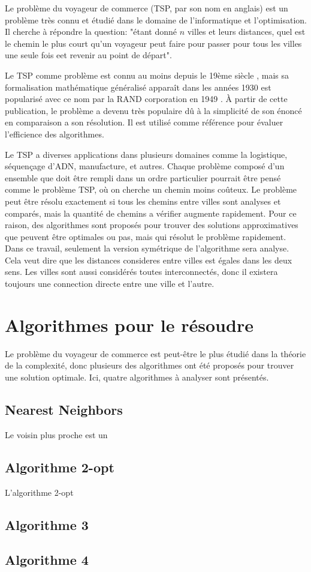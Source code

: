 Le problème du voyageur de commerce (TSP, par son nom en anglais) \cite{book:TSP,chap:TSP} est un problème très connu et étudié dans le domaine de l'informatique et l'optimisation. Il cherche à répondre la question: "étant donné $n$ villes et leurs distances, quel est le chemin le plus court qu'un voyageur peut faire pour passer pour tous les villes une seule fois eet revenir au point de départ".

Le TSP comme problème est connu au moins depuis le 19ème siècle \cite{book:TSP}, mais sa formalisation mathématique généralisé apparaît dans les années 1930 \cite{book:TSP} est popularisé avec ce nom par la RAND corporation en 1949 \cite{book:TSP}. À partir de cette publication, le problème a devenu très populaire dû à la simplicité de son énoncé en comparaison a son résolution. Il est utilisé comme référence pour évaluer l'efficience des algorithmes. %

Le TSP a diverses applications dans plusieurs domaines comme la logistique, séquençage d'ADN, manufacture, et autres. Chaque problème composé d'un ensemble que doit être rempli dans un ordre particulier pourrait être pensé comme le problème TSP, où on cherche un chemin moins coûteux. Le problème peut être résolu exactement si tous les chemins entre villes sont analyses et comparés, mais la quantité de chemins a vérifier augmente rapidement. Pour ce raison, des algorithmes sont proposés pour trouver des solutions approximatives que peuvent être optimales ou pas, mais qui résolut le problème rapidement. Dans ce travail, seulement la version symétrique de l'algorithme sera analyse. Cela veut dire que les distances consideres entre villes est égales dans les deux sens. Les villes sont aussi considérés toutes interconnectés, donc il existera toujours une connection directe entre une ville et l'autre.

\section{Algorithmes pour le résoudre}
Le problème du voyageur de commerce est peut-être le plus étudié dans la théorie de la complexité, donc plusieurs des algorithmes ont été proposés pour trouver une solution optimale. Ici, quatre algorithmes à analyser sont présentés.

\subsection{Nearest Neighbors}
Le voisin plus proche \cite{article:nearest} est un

\begin{algorithm}[H]

\end{algorithm}

\subsection{Algorithme 2-opt}
L'algorithme 2-opt \cite{article:2opt}

\begin{algorithm}[H]

\end{algorithm}

\subsection{Algorithme 3}
\subsection{Algorithme 4}